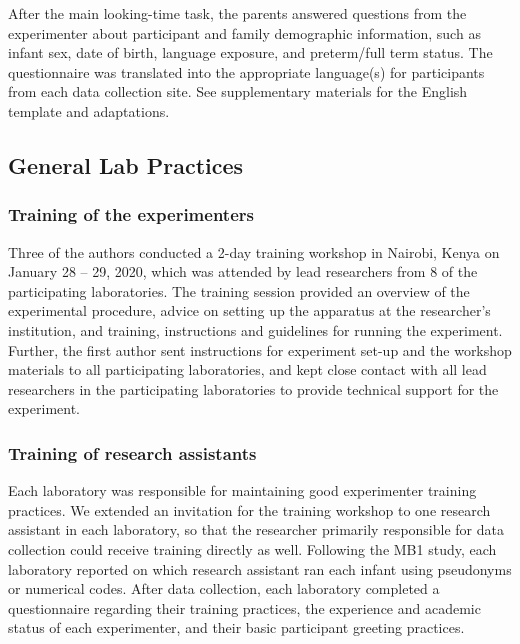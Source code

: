 \documentclass[
  english,
  ,man,floatsintext]{apa6}
\begin{document}
After the main looking-time task, the parents answered questions from the experimenter about participant and family demographic information, such as infant sex, date of birth, language exposure, and preterm/full term status. The questionnaire was translated into the appropriate language(s) for participants from each data collection site. See supplementary materials for the English template and adaptations.

\subsection{General Lab Practices}\label{general-lab-practices}

\subsubsection{Training of the experimenters}\label{training-of-the-experimenters}

Three of the authors conducted a 2-day training workshop in Nairobi, Kenya on January 28 -- 29, 2020, which was attended by lead researchers from 8 of the participating laboratories. The training session provided an overview of the experimental procedure, advice on setting up the apparatus at the researcher's institution, and training, instructions and guidelines for running the experiment. Further, the first author sent instructions for experiment set-up and the workshop materials to all participating laboratories, and kept close contact with all lead researchers in the participating laboratories to provide technical support for the experiment.

\subsubsection{Training of research assistants}\label{training-of-research-assistants}

Each laboratory was responsible for maintaining good experimenter training practices. We extended an invitation for the training workshop to one research assistant in each laboratory, so that the researcher primarily responsible for data collection could receive training directly as well. Following the MB1 study, each laboratory reported on which research assistant ran each infant using pseudonyms or numerical codes. After data collection, each laboratory completed a questionnaire regarding their training practices, the experience and academic status of each experimenter, and their basic participant greeting practices.
\end{document}
